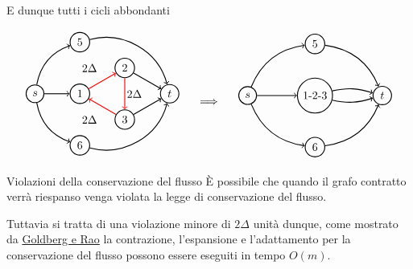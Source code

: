 E dunque tutti i cicli abbondanti

\[\begin{tabular}{ccc}
    \begin{tikzpicture}[node distance={18mm}, thick , main/.style = {draw, circle}] 
    
    \node[main] (0) {$s$};
    \node[main] (1) at (1*1.4,0) {1};
    \node[main] (2) at (2*1.4,0.577*1.4) {2};
    \node[main] (3) at (2*1.4,-0.577*1.4) {3};
    \node[main] (4) at (3*1.4,0) {$t$};
    \node[main] (5) at (1*1.4,1.154*1.4) {$5$};
    \node[main] (6) at (1*1.4,-1.154*1.4) {$6$};

    \draw[->] (0) [bend left] to (5);
    \draw[->] (0) [bend right] to (6);
    \draw[->] (0)  to (1);
    \draw[->] (1)[red]  to (2);
    \draw[->] (2)[red]  to (3);
    \draw[->] (3)[red]  to (1);
    \draw[->] (2)  to (4);
    \draw[->] (3)  to (4);
    \draw[->] (5) [bend left = 45] to (4);
    \draw[->] (6) [bend right = 45] to (4);

    \node at (3.1,0) {$2\Delta$};
    \node at (1.7,0.577*1.4) {$2\Delta$};
    \node at (1.7,-0.577*1.4) {$2\Delta$};
    

\end{tikzpicture}&\begin{tikzpicture}
    \node {$\implies$};%
    \node at (0,1.4) {};
    \node at (0,-1.6) {};
\end{tikzpicture}  &
\begin{tikzpicture}[node distance={19mm}, thick , main/.style = {draw, circle}] 
    \node[main] (0) {$s$};
    \node[main] (1) at (1.5*1.4,0) {1-2-3};
    \node[main] (5) at (1.5*1.4,1.154*1.4) {$5$};
    \node[main] (6) at (1.5*1.4,-1.154*1.4) {$6$};
    \node[main] (4) at (3*1.4,0) {$t$};

    \draw[->] (0) [bend left] to (5);
    \draw[->] (5) [bend left] to (4);
    \draw[->] (0) [bend right] to (6);
    \draw[->] (6) [bend right] to (4);

    \draw[->] (0) to (1);
    \draw[->] (1) [bend left= 15] to (4);
    \draw[->] (1) [bend right = 15] to (4);

\end{tikzpicture}
\end{tabular}\]
\begin{obs}{Violazioni della conservazione del flusso}{}
    È possibile che quando il grafo contratto verrà riespanso venga violata la legge di conservazione del flusso. 
    
    Tuttavia si tratta di una violazione minore di $2\Delta$ unità dunque, come mostrato da \hyperref[fixCont]{Goldberg e Rao} la contrazione, l'espansione e l'adattamento per la conservazione del flusso possono essere eseguiti in tempo $O(m)$. 
\end{obs}
